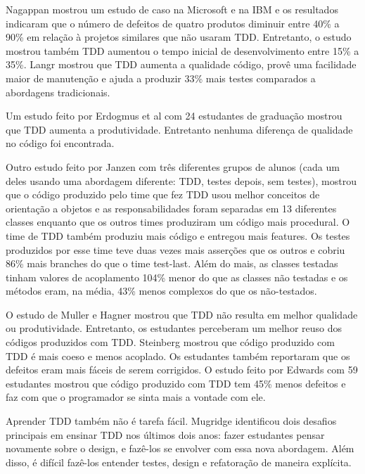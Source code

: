 Nagappan \cite{nagappan-ms} mostrou um estudo de caso na Microsoft e na IBM e os
resultados indicaram que o número de defeitos de quatro produtos diminuir entre 
40\% a 90\% em relação à projetos similares que não usaram TDD. Entretanto, o 
estudo mostrou também TDD aumentou o tempo inicial de desenvolvimento entre 15\%
a 35\%. Langr \cite{langr} mostrou que TDD aumenta a qualidade código, provê uma 
facilidade maior de manutenção e ajuda a produzir 33\% mais testes comparados  a
abordagens tradicionais.

Um estudo feito por Erdogmus et al \cite{erdogmus-morisio} com 24 estudantes de
graduação mostrou que TDD aumenta a produtividade. Entretanto nenhuma diferença 
de qualidade no código foi encontrada.

Outro estudo feito por Janzen \cite{janzen-saiedian} com três diferentes grupos
de alunos (cada um deles usando uma abordagem diferente: TDD, testes depois, sem
testes), mostrou que o código produzido pelo time que fez TDD usou melhor
conceitos  de orientação a objetos e as responsabilidades foram separadas em 13 
diferentes classes enquanto que os outros times produziram um código mais
procedural. O time de TDD também produziu mais código e entregou mais features.
Os testes produzidos por esse time teve duas vezes mais asserções que os outros 
e cobriu 86\% mais branches do que o time test-last. Além do mais, as classes 
testadas tinham valores de acoplamento 104\% menor do que as classes não
testadas e os métodos eram, na média, 43\% menos complexos do que os
não-testados.

O estudo de Muller e Hagner \cite{muller-e-hagner} mostrou que TDD não resulta
em melhor qualidade ou produtividade. Entretanto, os estudantes perceberam um 
melhor reuso dos códigos produzidos com TDD. Steinberg \cite{steinberg} mostrou
que código produzido com TDD é mais coeso e menos acoplado. Os estudantes também
reportaram que os defeitos eram mais fáceis de serem corrigidos. O estudo feito
por Edwards \cite{edwards} com 59 estudantes mostrou que código produzido com
TDD tem 45\% menos defeitos e faz com que o programador se sinta mais a vontade
com ele.

Aprender TDD também não é tarefa fácil. Mugridge \cite{mugridge} identificou
dois desafios principais em ensinar TDD nos últimos dois anos: fazer estudantes
pensar novamente sobre o design, e fazê-los se envolver com essa nova
abordagem. Além disso, é difícil fazê-los entender testes, design e refatoração
de maneira explícita.


